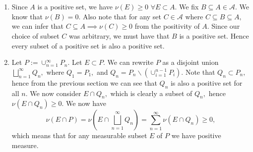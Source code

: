\documentclass{article}
\begin{document}
\section{} %
\begin{enumerate}
	\item Since $A$ is a positive set, we have $\nu(E)\geq 0$ $ \forall E \subset A.$ We fix $B \subseteq A \in \mathcal{A}.$ We know that $\nu(B)=0.$ Also note that for any set $C \in \mathcal{A}$ where $C \subseteq B \subseteq A,$ we can infer that $ C \subseteq A \implies \nu(C) \geq 0$ from the positivity of $A.$ Since our choice of subset $C$ was arbitrary, we must have that $B$ is a positive set. Hence every subset of a positive set is also a positive set.
	
	\item Let $P:= \cup_{n=1}^{\infty}P_n.$ Let $E \subset P.$ We can rewrite $P$ as a disjoint union $\bigsqcup_{n=1}^{\infty}Q_n,$ where $Q_1=P_1,$ and $Q_n=P_n\backslash (\cup_{i=1}^{n-1}P_i).$ Note that $Q_n \subset P_n,$ hence from the previous section we can see that $Q_n$ is also a positive set for all $n.$ We now consider $E \cap Q_n,$ which is clearly a subset of $Q_n,$ hence $ \nu(E \cap Q_n) \geq 0.$ We now have $$\nu(E \cap P)= \nu \left(E \cap \bigsqcup_{n=1}^{\infty} Q_n \right)= \sum_{n=1}^{\infty} \nu \left(E \cap Q_n \right) \geq 0,$$ which means that for any measurable subset $E$ of $P$ we have positive measure. 
	
\end{enumerate}
\end{document}
